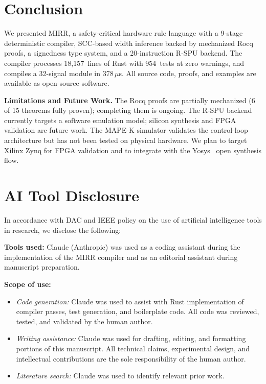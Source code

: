 \documentclass[conference]{IEEEtran}
\begin{document}
\section{Conclusion}\label{sec:conclusion}

We presented MIRR, a safety-critical hardware rule language with a
9-stage deterministic compiler, SCC-based width inference backed by
mechanized Rocq proofs, a signedness type system, and a 20-instruction
R-SPU backend.  The compiler processes 18,157~lines of Rust with
954~tests at zero warnings, and compiles a 32-signal module in
378\,$\mu$s.  All source code, proofs, and examples are available as
open-source software.

\textbf{Limitations and Future Work.}
The Rocq proofs are partially mechanized (6 of 15 theorems fully proven);
completing them is ongoing.  The R-SPU backend currently targets a
software emulation model; silicon synthesis and FPGA validation are
future work.  The MAPE-K simulator validates the control-loop
architecture but has not been tested on physical hardware.  We plan to
target Xilinx Zynq for FPGA validation and to integrate with the
Yosys~\cite{wolf2013yosys} open synthesis flow.

\section*{AI Tool Disclosure}

In accordance with DAC and IEEE policy on the use of artificial
intelligence tools in research, we disclose the following:

\textbf{Tools used:} Claude (Anthropic) was used as a coding assistant
during the implementation of the MIRR compiler and as an editorial
assistant during manuscript preparation.

\textbf{Scope of use:}
\begin{itemize}
\item \emph{Code generation:} Claude was used to assist with Rust
      implementation of compiler passes, test generation, and
      boilerplate code.  All code was reviewed, tested, and validated
      by the human author.
\item \emph{Writing assistance:} Claude was used for drafting,
      editing, and formatting portions of this manuscript.  All
      technical claims, experimental design, and intellectual
      contributions are the sole responsibility of the human author.
\item \emph{Literature search:} Claude was used to identify
      relevant prior work.
\end{itemize}
\end{document}
